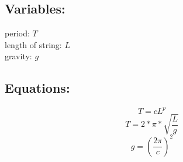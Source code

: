 \documentclass[12pt]{extarticle}
\begin{document}
\subsection{Variables:}
period: $T$
\\ length of string: $L$
\\ gravity: $g$
\\\subsection{Equations:}
\begin{equation}
    T = cL^p
\end{equation}
\begin{equation}
    T = 2*\pi*\sqrt{\frac{L}{g}}
\end{equation}
\begin{equation}
    g=(\frac{2 \pi}{c})^2
\end{equation}
\end{document}
